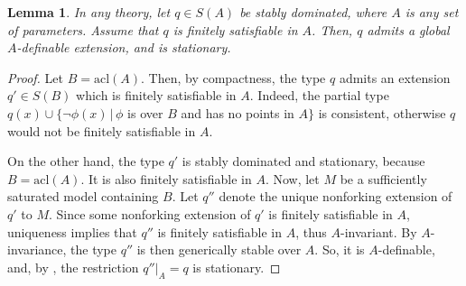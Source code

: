 \documentclass[12pt]{article}
\newcommand{\tpp}{\mathrm{tp}}
\newcommand{\ACVF}{\mathrm{ACVF}}
\newcommand{\acl}{\mathrm{acl}}
\newcommand{\st}{\mathrm{St}}
\newcommand{\0}{\emptyset}
\newcommand{\U}{\mathcal{U}}
\newcommand{\Ualg}{\mathcal{U}_0}
\def\forkindep{\mathrel{\raise0.2ex\hbox{\ooalign{\hidewidth$\vert$\hidewidth\cr\raise-0.9ex\hbox{$\smile$}}}}}
\theoremstyle{plain}%
\newtheorem{lem}[thm]{Lemma}
\newtheorem{rem}[thm]{Remark}
\theoremstyle{definition}
\theoremstyle{remark}
\begin{document}

    \begin{lem}\label{lemma_fin_sat_implies_stationary}
        In any theory, let $q \in S(A)$ be stably dominated, where $A$ is any set of parameters. Assume that $q$ is finitely satisfiable in $A$. Then, $q$ admits a global $A$-definable extension, and is stationary.
    \end{lem}

    \begin{proof}
        Let $B = \acl(A)$. Then, by compactness, the type $q$ admits an extension $q' \in S(B)$ which is finitely satisfiable in $A$. Indeed, the partial type 
        $q(x) \cup \lbrace \neg \phi(x) \, | \, \phi $ is over $B$ and has no points in $A \rbrace$ is consistent, otherwise $q$ would not be finitely satisfiable in $A$.


        On the other hand, the type $q'$ is stably dominated and stationary, because $B = \acl(A)$. It is also finitely satisfiable in $A$. Now, let $M$ be a sufficiently saturated model containing $B$. Let $q''$ denote the unique nonforking extension of $q'$ to $M$. Since some nonforking extension of $q'$ is finitely satisfiable in $A$, uniqueness implies that $q''$ is finitely satisfiable in $A$, thus $A$-invariant. By $A$-invariance, the type $q''$ is then generically stable over $A$. So, it is $A$-definable, and, by \cite[Proposition 2.1]{pillay-tanovic}, the restriction $q''|_A = q$ is stationary.   
    \end{proof}




\end{document}
